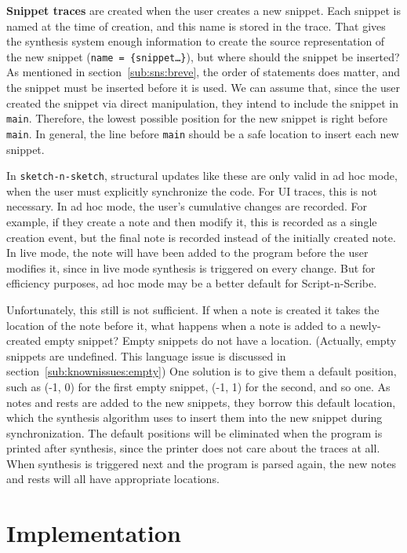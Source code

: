 \documentclass[nocopyrightspace,numbers,10pt]{sigplanconf}
\newcommand{\sketch}{\texttt{sketch-n-sketch}}
\newcommand{\sns}{Script-n-Scribe}
\begin{document}
\textbf{Snippet traces} are created when the user creates a new snippet. Each
snippet is named at the time of creation, and this name is stored in the trace.
That gives the synthesis system enough information to create the source
representation of the new snippet (\texttt{name = \{snippet\dots\}}), but where
should the snippet be inserted? As mentioned in section~\ref{sub:sns:breve}, the
order of statements does matter, and the snippet must be inserted before it is
used. We can assume that, since the user created the snippet via direct
manipulation, they intend to include the snippet in \texttt{main}. Therefore,
the lowest possible position for the new snippet is right before \texttt{main}.
In general, the line before \texttt{main} should be a safe location to insert
each new snippet.

In \sketch, structural updates like these are only valid in ad hoc mode, when
the user must explicitly synchronize the code. For UI traces, this is not
necessary. In ad hoc mode, the user's cumulative changes are recorded. For
example, if they create a note and then modify it, this is recorded as a single
creation event, but the final note is recorded instead of the initially created
note. In live mode, the note will have been added to the program before the user
modifies it, since in live mode synthesis is triggered on every change. But for
efficiency purposes, ad hoc mode may be a better default for \sns{}.

Unfortunately, this still is not sufficient. If when a note is created it takes
the location of the note before it, what happens when a note is added to a
newly-created empty snippet? Empty snippets do not have a location. (Actually,
empty snippets are undefined. This language issue is discussed in
section~\ref{sub:knownissues:empty}) One solution is to give them a default
position, such as (-1, 0) for the first empty snippet, (-1, 1) for the second,
and so one. As notes and rests are added to the new snippets, they borrow this
default location, which the synthesis algorithm uses to insert them into the new
snippet during synchronization. The default positions will be eliminated when
the program is printed after synthesis, since the printer does not care about
the traces at all. When synthesis is triggered next and the program is parsed
again, the new notes and rests will all have appropriate locations.

\section{Implementation}
\label{sec:impl}
\end{document}
